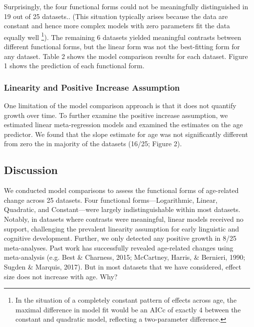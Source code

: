 \documentclass[
  man]{apa6}
\begin{document}
Surprisingly, the four functional forms could not be meaningfully distinguished in 19 out of 25 datasets.. (This situation typically arises because the data are constant and hence more complex models with zero parameters fit the data equally well \footnote{In the situation of a completely constant pattern of effects across age, the maximal difference in model fit would be an AICc of exactly 4 between the constant and quadratic model, reflecting a two-parameter difference.}). The remaining 6 datasets yielded meaningful contrasts between different functional forms, but the linear form was not the best-fitting form for any dataset. Table 2 shows the model comparison results for each dataset. Figure 1 shows the prediction of each functional form.

\hypertarget{linearity-and-positive-increase-assumption}{%
\subsubsection{Linearity and Positive Increase Assumption}\label{linearity-and-positive-increase-assumption}}

One limitation of the model comparison approach is that it does not quantify growth over time. To further examine the positive increase assumption, we estimated linear meta-regression models and examined the estimates on the age predictor. We found that the slope estimate for age was not significantly different from zero the in majority of the datasets (16/25; Figure 2).

\hypertarget{discussion}{%
\subsection{Discussion}\label{discussion}}

We conducted model comparisons to assess the functional forms of age-related change across 25 datasets. Four functional forms---Logarithmic, Linear, Quadratic, and Constant---were largely indistinguishable within most datasets. Notably, in datasets where contrasts were meaningful, linear models received no support, challenging the prevalent linearity assumption for early linguistic and cognitive development. Further, we only detected any positive growth in 8/25 meta-analyses. Past work has successfully revealed age-related changes using meta-analysis (e.g. Best \& Charness, 2015; McCartney, Harris, \& Bernieri, 1990; Sugden \& Marquis, 2017). But in most datasets that we have considered, effect size does not increase with age. Why?
\end{document}
